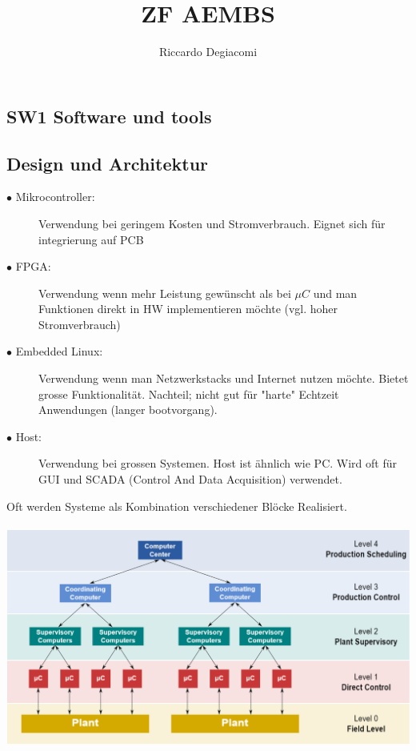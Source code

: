 \documentclass[a4paper, 8pt]{extarticle}
\title{ZF AEMBS}
\author{Riccardo Degiacomi}
\begin{document}
\begin{multicols*}{3}
	\section{SW1 Software und tools}
	\subsection{Design und Architektur}
	\begin{description}
		
		\item[$\bullet$ Mikrocontroller:] Verwendung bei geringem Kosten und Stromverbrauch. Eignet sich für integrierung auf PCB
		\item[$\bullet$ FPGA:] Verwendung wenn mehr Leistung gewünscht als bei $\mu C$ und man Funktionen direkt in HW implementieren möchte (vgl. hoher Stromverbrauch)
		\item[$\bullet$ Embedded Linux:] Verwendung wenn man Netzwerkstacks und Internet nutzen möchte. Bietet grosse Funktionalität. Nachteil; nicht gut für "harte" Echtzeit Anwendungen (langer bootvorgang).
		\item[$\bullet$ Host:] Verwendung bei grossen Systemen. Host ist ähnlich wie PC. Wird oft für GUI und SCADA (Control And Data Acquisition) verwendet.
		
	\end{description}
	Oft werden Systeme als Kombination verschiedener Blöcke Realisiert.\\
	\\
	\includegraphics[width=1\linewidth, left]{img/Hardware_Hierarchie}

\end{multicols*}
\end{document}
